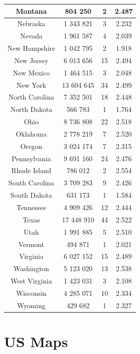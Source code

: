 \documentclass[a4paper,9pt,calibri,oneside,openany, twocolumn]{report}
\theoremstyle{break}
\begin{document}
\begin{table}
\begin{tabular}{|c|c|c|c|}
	\hline
	Montana &804 250&2&2.487\\
	\hline
	Nebraska &1 343 821&3&2.232\\
	\hline
	Nevada &1 961 587&4&2.039\\
	\hline
	New Hampshire &1 042 795&2&1.918\\
	\hline
	New Jersey &6 013 656&15&2.494\\
	\hline
	New Mexico &1 464 515&3&2.048\\
	\hline
	New York &13 604 645&34&2.499\\
	\hline
	North Carolina &7 352 501&18&2.448\\
	\hline
	North Dakota &566 783&1&1.764\\
	\hline
	Ohio &8 736 808&22&2.518\\
	\hline
	Oklahoma &2 778 219&7&2.520\\
	\hline
	Oregon &3 024 174&7&2.315\\
	\hline
	Pennsylvania &9 691 160&24&2.476\\
	\hline
	Rhode Island &786 012&2&2.554\\
	\hline
	South Carolina &3 709 283&9&2.426\\
	\hline
	South Dakota &631 173&1&1.584\\
	\hline
	Tennessee &4 909 426&12&2.444\\
	\hline
	Texas &17 448 910&44&2.522\\
	\hline
	Utah &1 991 885&5&2.510\\
	\hline
	Vermont &494 871&1&2.021\\
	\hline
	Virginia &6 027 152&15&2.489\\
	\hline
	Washington &5 123 020&13&2.538\\
	\hline
	West Virginia &1 423 031&3&2.108\\
	\hline
	Wisconsin &4 285 071&10&2.334\\
	\hline
	Wyoming &429 682&1&2.327\\
	\hline
	\end{tabular}
\end{table}

\clearpage
\section*{US Maps}
\end{document}
